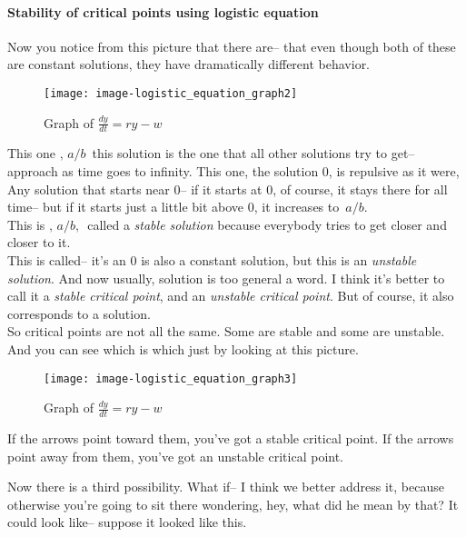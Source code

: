 \paragraph{Stability of critical points using logistic equation}

Now you notice from this picture that there are--
that even though both of these are constant solutions,
they have dramatically different behavior.

\begin{wrapfigure}{r}{5.5cm}
  \texttt{[image: image-logistic\_equation\_graph2]}
  \caption{Graph of $\frac{dy}{dt} = ry - w$}
\end{wrapfigure}

This one $,\, a/b\,$ this solution is the one
that all other solutions try to get-- approach as time goes to infinity.
This one, the solution $0$, is repulsive
as it were, Any solution that starts near $0$--
if it starts at 0, of course, it stays there for all time--
but if it starts just a little bit above $0$, it increases to $\,a/b$. \\
This is $,\, a/b ,\,$ called a \emph{stable solution} because everybody tries
to get closer and closer to it. \\
This is called-- it's an $0$ is also a constant solution, but this
is an \emph{unstable solution}.
And now usually, solution is too general a word.
I think it's better to call it a \emph{stable critical point},
and an \emph{unstable critical point}.
But of course, it also corresponds to a solution.\\

So critical points are not all the same.
Some are stable and some are unstable.
And you can see which is which just
by looking at this picture.

\begin{figure}[ht!]
  \centering
    \texttt{[image: image-logistic\_equation\_graph3]}
  \caption{Graph of $\frac{dy}{dt} = ry - w$}
\end{figure}

If the arrows point toward them, you've got a stable critical point.
If the arrows point away from them, you've got an unstable critical point.\\

\clearpage

Now there is a third possibility.
What if-- I think we better address it,
because otherwise you're going to sit there wondering, hey,
what did he mean by that?
It could look like-- suppose it looked like this.

